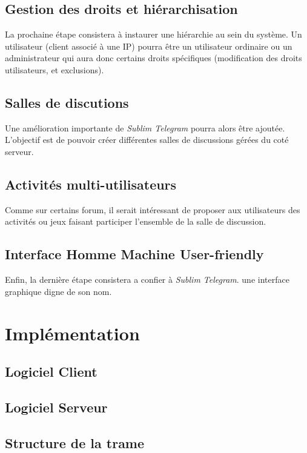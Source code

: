 \documentclass[a4paper, 12pt]{article}
\begin{document}
\subsection{Gestion des droits et hiérarchisation}
La prochaine étape consistera à instaurer une hiérarchie au sein du système. Un utilisateur (client associé à une IP) pourra être un utilisateur ordinaire ou un administrateur qui aura donc certains droits spécifiques (modification des droits utilisateurs, et exclusions).
\subsection{Salles de discutions}
Une amélioration importante de \emph{Sublim Telegram} pourra alors être ajoutée. L'objectif est de pouvoir créer différentes salles de discussions gérées du coté serveur.
\subsection{Activités multi-utilisateurs}
Comme sur certains forum, il serait intéressant de proposer aux utilisateurs des activités ou jeux faisant participer l'ensemble de la salle de discussion.
\subsection{Interface Homme Machine User-friendly}
Enfin, la dernière étape consistera a confier à \emph{Sublim Telegram}. une interface graphique digne de son nom.
\section{Implémentation}
\subsection{Logiciel Client}
\subsection{Logiciel Serveur}
\subsection{Structure de la trame}
\end{document}
